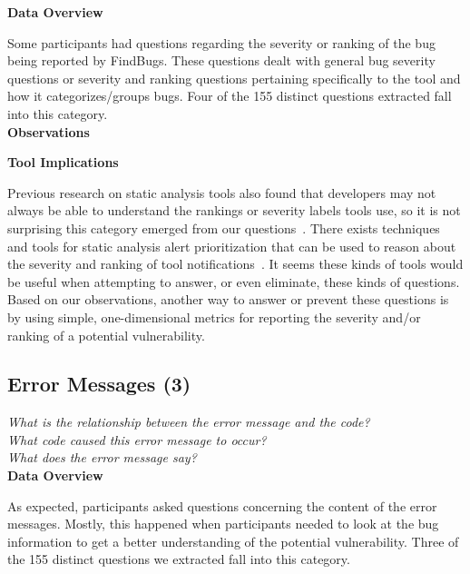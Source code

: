 \documentclass[conference]{IEEEtran}
\begin{document}
\noindent\textbf{Data Overview}

Some participants had questions regarding the severity or ranking of the bug being reported by FindBugs. 
These questions dealt with general bug severity questions or severity and ranking questions pertaining specifically to the tool and how it categorizes/groups bugs. 
Four of the 155 distinct questions extracted fall into this category. 
\\

\noindent\textbf{Observations}


\noindent\textbf{Tool Implications}

Previous research on static analysis tools also found that developers may not always be able to understand the rankings or severity labels tools use, so it is not surprising this category emerged from our questions~\cite{johnson2013don}.
There exists techniques and tools for static analysis alert prioritization that can be used to reason about the severity and ranking of tool notifications~\cite{kim2007prioritizing, boogerd2006prioritizing, kremenek2004correlation}.
It seems these kinds of tools would be useful when attempting to answer, or even eliminate, these kinds of questions. 
Based on our observations, another way to answer or prevent these questions is by using simple, one-dimensional metrics for reporting the severity and/or ranking of a potential vulnerability.



\noindent\subsection{\textbf{Error Messages (3)}}\label{em}

\noindent\emph{What is the relationship between the error message and the code?} \\
\emph{What code caused this error message to occur?} \\
\emph{What does the error message say?} \\


\noindent\textbf{Data Overview}

As expected, participants asked questions concerning the content of the error messages. 
Mostly, this happened when participants needed to look at the bug information to get a better understanding of the potential vulnerability. 
Three of the 155 distinct questions we extracted fall into this category.
\\
\end{document}
